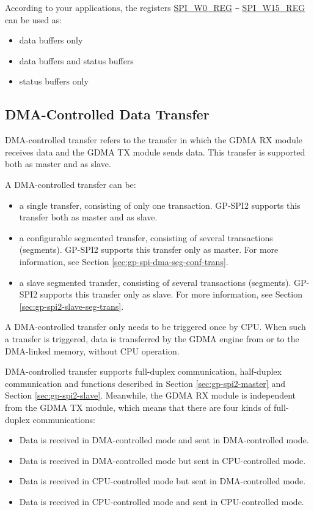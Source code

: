\documentclass[main\_\_EN.tex]{subfiles}
\begin{document}
According to your applications, the registers \hyperref[regdesc:SPIW0REG]{SPI\_W0\_REG} \verb+~+ \hyperref[regdesc:SPIW0REG]{SPI\_W15\_REG} can be used as:
\begin{itemize}
    \item data buffers only
    \item data buffers and status buffers
    \item status buffers only
\end{itemize}

\subsection{DMA-Controlled Data Transfer}\label{sec:usage-of-gp-spi2-dma-controlled-mode}

DMA-controlled transfer refers to the transfer in which the GDMA RX module receives data and the GDMA TX module sends data. This transfer is supported both as master and as slave.

A DMA-controlled transfer can be:

\begin{itemize}
    \item a single transfer, consisting of only one transaction. GP-SPI2 supports this transfer both as master and as slave.
    \item a configurable segmented transfer, consisting of several transactions (segments). GP-SPI2 supports this transfer only as master. For more information, see Section \ref{sec:gp-spi-dma-seg-conf-trans}.
    \item a slave segmented transfer, consisting of several transactions (segments). GP-SPI2 supports this transfer only as slave. For more information, see Section \ref{sec:gp-spi2-slave-seg-trans}.
\end{itemize}

A DMA-controlled transfer only needs to be triggered once by CPU. When such a transfer is triggered, data is transferred by the GDMA engine from or to the DMA-linked memory, without CPU operation.

DMA-controlled transfer supports full-duplex communication, half-duplex communication and functions described in Section \ref{sec:gp-spi2-master} and Section \ref{sec:gp-spi2-slave}. Meanwhile, the GDMA RX module is independent from the GDMA TX module, which means that there are four kinds of full-duplex communications:

\begin{itemize}
    \item Data is received in DMA-controlled mode and sent in DMA-controlled mode.
    
    \item Data is received in DMA-controlled mode but sent in CPU-controlled mode. 
    
    \item Data is received in CPU-controlled mode but sent in DMA-controlled mode.
    
    \item Data is received in CPU-controlled mode and sent in CPU-controlled mode.
    
\end{itemize}
\end{document}
